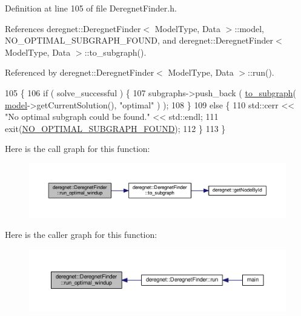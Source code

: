 Definition at line 105 of file Deregnet\+Finder.\+h.



References deregnet\+::\+Deregnet\+Finder$<$ Model\+Type, Data $>$\+::model, N\+O\+\_\+\+O\+P\+T\+I\+M\+A\+L\+\_\+\+S\+U\+B\+G\+R\+A\+P\+H\+\_\+\+F\+O\+U\+ND, and deregnet\+::\+Deregnet\+Finder$<$ Model\+Type, Data $>$\+::to\+\_\+subgraph().



Referenced by deregnet\+::\+Deregnet\+Finder$<$ Model\+Type, Data $>$\+::run().


\begin{DoxyCode}
105                                                                                                            
         \{
106     \textcolor{keywordflow}{if} ( solve\_successful ) \{
107         subgraphs->push\_back ( \hyperlink{classderegnet_1_1DeregnetFinder_a681d5e2506f9b6075ab36e742a360328}{to\_subgraph}( \hyperlink{classderegnet_1_1DeregnetFinder_ad922d8e38124b4c75daac29a928fcf5b}{model}->getCurrentSolution(), \textcolor{stringliteral}{"optimal"} ) );
108     \}
109     \textcolor{keywordflow}{else} \{
110         std::cerr << \textcolor{stringliteral}{"No optimal subgraph could be found."} << std::endl;
111         exit(\hyperlink{DeregnetData_8h_a4cfde67e3f13f361cd54de13be284610}{NO\_OPTIMAL\_SUBGRAPH\_FOUND});
112     \}
113 \}
\end{DoxyCode}


Here is the call graph for this function\+:
\nopagebreak
\begin{figure}[H]
\begin{center}
\leavevmode
\includegraphics[width=350pt]{classderegnet_1_1DeregnetFinder_a92610c1444ba271820e64d224ec64bb7_cgraph}
\end{center}
\end{figure}




Here is the caller graph for this function\+:\nopagebreak
\begin{figure}[H]
\begin{center}
\leavevmode
\includegraphics[width=350pt]{classderegnet_1_1DeregnetFinder_a92610c1444ba271820e64d224ec64bb7_icgraph}
\end{center}
\end{figure}


